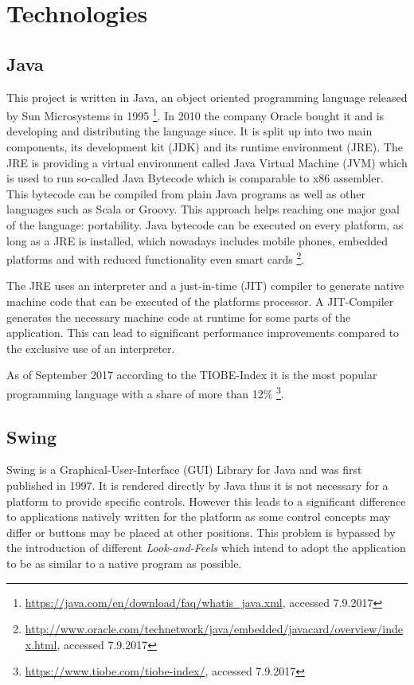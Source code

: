 \section{Technologies}
\subsection{Java}
This project is written in Java, an object oriented programming language released by Sun Microsystems in 1995  \footnote{\href{https://java.com/en/download/faq/whatis_java.xml}{https://java.com/en/download/faq/whatis\_java.xml}, accessed 7.9.2017}. In 2010 the company Oracle bought it and is developing and distributing the language since. It is split up into two main components, its development kit (JDK) and its runtime environment (JRE). The JRE is providing a virtual environment called Java Virtual Machine (JVM) which is used to run so-called Java Bytecode which is comparable to x86 assembler. This bytecode can be compiled from plain Java programs as well as other languages such as Scala or Groovy. 
This approach helps reaching one major goal of the language: portability. Java bytecode can be executed on every platform, as long as a JRE is installed, which nowadays includes mobile phones, embedded platforms and with reduced functionality even smart cards \footnote{\href{http://www.oracle.com/technetwork/java/embedded/javacard/overview/index.html}{http://www.oracle.com/technetwork/java/embedded/javacard/overview/index.html}, accessed 7.9.2017}. 

The JRE uses an interpreter and a just-in-time (JIT) compiler to generate native machine code that can be executed of the platforms processor. A JIT-Compiler generates the necessary machine code at runtime for some parts of the application. This can lead to significant performance improvements compared to the exclusive use of an interpreter.

As of September 2017 according to the TIOBE-Index it is the most popular programming language with a share of more than 12\% \footnote{\href{https://www.tiobe.com/tiobe-index/}{https://www.tiobe.com/tiobe-index/}, accessed 7.9.2017}. 
\subsection{Swing}
\label{sec:swing}
Swing is a Graphical-User-Interface (GUI) Library for Java and was first published in 1997. It is rendered directly by Java thus it is not necessary for a platform to provide specific controls. However this leads to a significant difference to applications natively written for the platform as some control concepts may differ or buttons may be placed at other positions. This problem is bypassed by the introduction of different \emph{Look-and-Feels} which intend to adopt the application to be as similar to a native program as possible.

